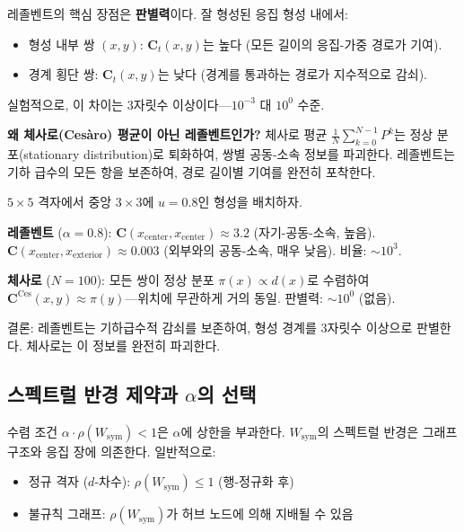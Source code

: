 레졸벤트의 핵심 장점은 \textbf{판별력}이다. 잘 형성된 응집 형성 내에서:
\begin{itemize}
    \item 형성 내부 쌍 $(x, y)$: $\mathbf{C}_t(x,y)$는 높다 (모든 길이의 응집-가중 경로가 기여).
    \item 경계 횡단 쌍: $\mathbf{C}_t(x,y)$는 낮다 (경계를 통과하는 경로가 지수적으로 감쇠).
\end{itemize}
실험적으로, 이 차이는 $3$자릿수 이상이다---$10^{-3}$ 대 $10^0$ 수준.

\textbf{왜 체사로(Cesàro) 평균이 아닌 레졸벤트인가?} 체사로 평균 $\frac{1}{N}\sum_{k=0}^{N-1} P^k$는 정상 분포(stationary distribution)로 퇴화하여, 쌍별 공동-소속 정보를 파괴한다. 레졸벤트는 기하 급수의 모든 항을 보존하여, 경로 길이별 기여를 완전히 포착한다.

\begin{example}
$5 \times 5$ 격자에서 중앙 $3 \times 3$에 $u = 0.8$인 형성을 배치하자.

\textbf{레졸벤트} ($\alpha = 0.8$): $\mathbf{C}(x_{\text{center}}, x_{\text{center}}) \approx 3.2$ (자기-공동-소속, 높음). $\mathbf{C}(x_{\text{center}}, x_{\text{exterior}}) \approx 0.003$ (외부와의 공동-소속, 매우 낮음). 비율: $\sim 10^3$.

\textbf{체사로} ($N = 100$): 모든 쌍이 정상 분포 $\pi(x) \propto d(x)$로 수렴하여 $\mathbf{C}^{\text{Ces}}(x, y) \approx \pi(y)$---위치에 무관하게 거의 동일. 판별력: $\sim 10^0$ (없음).

결론: 레졸벤트는 기하급수적 감쇠를 보존하여, 형성 경계를 3자릿수 이상으로 판별한다. 체사로는 이 정보를 완전히 파괴한다.
\end{example}

\subsection{스펙트럴 반경 제약과 $\alpha$의 선택}

수렴 조건 $\alpha \cdot \rho(W_{\mathrm{sym}}) < 1$은 $\alpha$에 상한을 부과한다. $W_{\mathrm{sym}}$의 스펙트럴 반경은 그래프 구조와 응집 장에 의존한다. 일반적으로:
\begin{itemize}
    \item 정규 격자 ($d$-차수): $\rho(W_{\mathrm{sym}}) \leq 1$ (행-정규화 후)
    \item 불규칙 그래프: $\rho(W_{\mathrm{sym}})$가 허브 노드에 의해 지배될 수 있음
\end{itemize}

